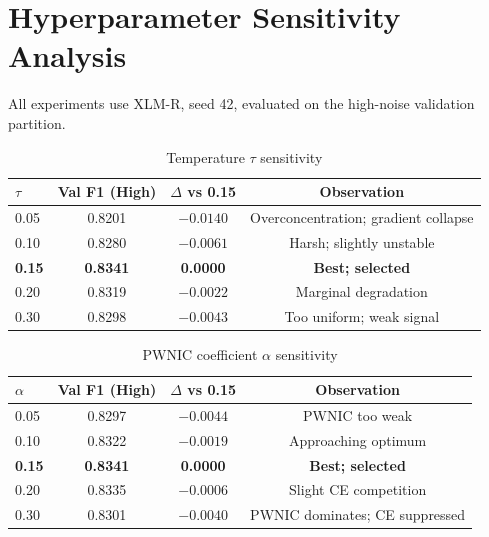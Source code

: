 \documentclass[12pt,a4paper]{report}
\begin{document}
\chapter{Hyperparameter Sensitivity Analysis}
\label{app:sensitivity}

All experiments use XLM-R, seed 42, evaluated on the high-noise validation partition.

\begin{table}[H]
\centering
\caption{Temperature $\tau$ sensitivity}
\label{tab:tau_sens}
\small
\begin{tabular}{lccc}
\toprule
$\tau$ & Val F1 (High) & $\Delta$ vs 0.15 & Observation\\
\midrule
0.05 & 0.8201 & $-0.0140$ & Overconcentration; gradient collapse \\
0.10 & 0.8280 & $-0.0061$ & Harsh; slightly unstable \\
\textbf{0.15} & \textbf{0.8341} & \textbf{0.0000} & \textbf{Best; selected} \\
0.20 & 0.8319 & $-0.0022$ & Marginal degradation \\
0.30 & 0.8298 & $-0.0043$ & Too uniform; weak signal \\
\bottomrule
\end{tabular}
\end{table}

\begin{table}[H]
\centering
\caption{PWNIC coefficient $\alpha$ sensitivity}
\label{tab:alpha_sens}
\small
\begin{tabular}{lccc}
\toprule
$\alpha$ & Val F1 (High) & $\Delta$ vs 0.15 & Observation\\
\midrule
0.05 & 0.8297 & $-0.0044$ & PWNIC too weak \\
0.10 & 0.8322 & $-0.0019$ & Approaching optimum \\
\textbf{0.15} & \textbf{0.8341} & \textbf{0.0000} & \textbf{Best; selected} \\
0.20 & 0.8335 & $-0.0006$ & Slight CE competition \\
0.30 & 0.8301 & $-0.0040$ & PWNIC dominates; CE suppressed \\
\bottomrule
\end{tabular}
\end{table}
\end{document}
